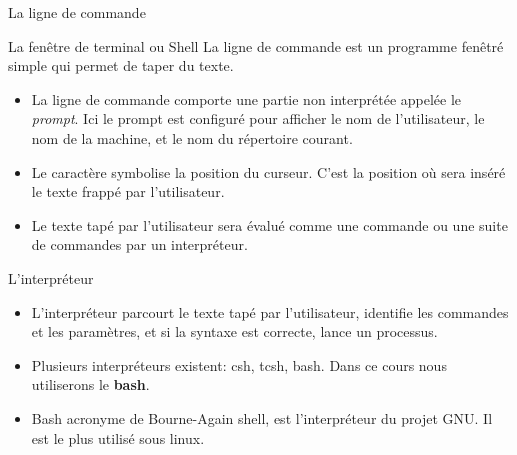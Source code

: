 \begin{frame}{La ligne de commande}
  \begin{center}
    \mprompt{
      \prompt{\cursor}{}
    }
  \end{center}
  \begin{block}{La fenêtre de terminal ou Shell}
    La ligne de commande est un programme fenêtré simple qui permet de taper du texte.
    \begin{itemize}
    \item La ligne de commande comporte une partie non interprétée  appelée le \textit{prompt}. Ici le prompt est configuré pour afficher le {\color{red}nom de l'utilisateur}, le {\color{ForestGreen}nom de la machine}, et le {\color{MediumBlue}nom du répertoire courant}.
    \item Le caractère \lin{\cursor} symbolise la position du curseur. C'est la position où sera inséré le texte frappé par l'utilisateur.
    \item Le texte tapé par l'utilisateur sera évalué comme une commande ou une suite de commandes par un interpréteur.
    \end{itemize}
  \end{block}
  \begin{block}{L'interpréteur}
    \begin{itemize}
    \item L'interpréteur parcourt le texte tapé par l'utilisateur, identifie les commandes et les paramètres, et si la syntaxe est correcte, lance un processus.
    \item Plusieurs interpréteurs existent: csh, tcsh, bash. Dans ce cours nous utiliserons le \textbf{bash}. 
    \item Bash acronyme de Bourne-Again shell, est l'interpréteur du projet GNU. Il est le plus utilisé sous linux.
    \end{itemize}
  \end{block}
\end{frame}
